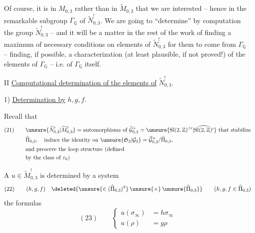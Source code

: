 Of course, it is in $M_{0,3}$  rather than in $\widetilde M_{0,3}$  that we are interested -- hence in the remarkable subgroup $\Gamma_{\mathbb Q}$ of $\widetilde N_{0,3}^{!}$. We are going to ``determine'' by computation the group $\widetilde N_{0,3}^{!}$ -- and it will be a matter in the rest of the work of finding a maximum of necessary conditions on elements of $\widetilde N_{0,3}^{!}$ for them to come from $\Gamma_{\mathbb Q}$ --  finding, if possible, a characterization (at least plausible, if not proved!) of the elements of $\Gamma_{\mathbb Q}$ -- i.e. of $\Gamma_{\mathbb Q}$ itself.


II \uline{Computational determination of the elements of} $\widetilde N_{0,3}^{!}$.

1) \uline{Determination by} $h,g,f$.


Recall that
\[
\begin{aligned}
(21)\qquad
&\unsure{\widetilde N_{0,3}^{!}|\widetilde M_{0,3}^{!}}
=\text{automorphisms of }\widehat{\mathcal G}_{0,3}^{+}
\simeq\unsure{\mathrm{Sl}(2,\mathbb Z)^{\wedge\prime}|\widehat{\mathrm{Sl}(2,\mathbb Z)^{\prime}}}
\text{ that stabilize}\\
&\widehat\Pi_{0,3},\quad\text{induce the identity on }
\unsure{\mathfrak S_3|\mathcal G_3}
=\widehat{\mathcal G}_{0,3}^{+}/\widehat\Pi_{0,3},\\
&\text{and preserve the loop structure (defined}\\
&\text{by the class of }\varepsilon_0\text{)}
\end{aligned}
\]

A $u\in\widetilde M_{0,3}^{!}$ is determined by a system
\[
(22)\qquad (h,g,f)\quad
\deleted{\unsure{\in(\widehat{\Pi}_{0,3})^{3}}\,\unsure{\times}\,\unsure{\widehat{\Pi}_{0,3}}}
\qquad(h,g,f\in\widehat\Pi_{0,3})
\]
 the formulas
\[
(23)\qquad
\left\{\begin{aligned}
u(\sigma_\infty)&=h\sigma_\infty\\
u(\rho)&=g\rho
\end{aligned}\right.
\]

